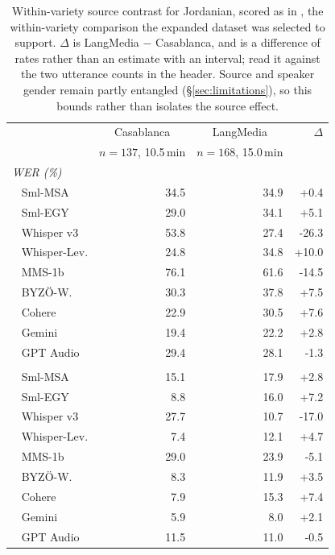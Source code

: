 \begin{table}[t]
\centering
\small
\setlength{\tabcolsep}{4pt}
\begin{tabular*}{\columnwidth}{@{\extracolsep{\fill}}l rr r@{}}
\toprule
& \multicolumn{1}{c}{Casablanca} & \multicolumn{1}{c}{LangMedia} & $\Delta$ \\
& \multicolumn{1}{c}{\scriptsize $n=137$, 10.5\,min} & \multicolumn{1}{c}{\scriptsize $n=168$, 15.0\,min} & \\
\midrule
\multicolumn{4}{l}{\textit{WER (\%)}} \\
\addlinespace[2pt]
~ Sml-MSA & 34.5 & 34.9 & +0.4 \\
~ Sml-EGY & 29.0 & 34.1 & +5.1 \\
~ Whisper v3 & 53.8 & 27.4 & -26.3 \\
~ Whisper-Lev. & 24.8 & 34.8 & +10.0 \\
~ MMS-1b & 76.1 & 61.6 & -14.5 \\
~ BYZÖ-W. & 30.3 & 37.8 & +7.5 \\
~ Cohere & 22.9 & 30.5 & +7.6 \\
~ Gemini & 19.4 & 22.2 & +2.8 \\
~ GPT Audio & 29.4 & 28.1 & -1.3 \\
\addlinespace[2pt]\midrule\addlinespace[2pt]
\multicolumn{4}{l}{\textit{CER (\%)}} \\
\addlinespace[2pt]
~ Sml-MSA & 15.1 & 17.9 & +2.8 \\
~ Sml-EGY & 8.8 & 16.0 & +7.2 \\
~ Whisper v3 & 27.7 & 10.7 & -17.0 \\
~ Whisper-Lev. & 7.4 & 12.1 & +4.7 \\
~ MMS-1b & 29.0 & 23.9 & -5.1 \\
~ BYZÖ-W. & 8.3 & 11.9 & +3.5 \\
~ Cohere & 7.9 & 15.3 & +7.4 \\
~ Gemini & 5.9 & 8.0 & +2.1 \\
~ GPT Audio & 11.5 & 11.0 & -0.5 \\
\bottomrule
\end{tabular*}
\caption{Within-variety source contrast for Jordanian, scored as in , the within-variety comparison the expanded dataset was selected to support. $\Delta$ is LangMedia $-$ Casablanca, and is a difference of rates rather than an estimate with an interval; read it against the two utterance counts in the header. Source and speaker gender remain partly entangled (\S\ref{sec:limitations}), so this bounds rather than isolates the source effect.}
\label{tab:asr-source-jordanian}
\end{table}
